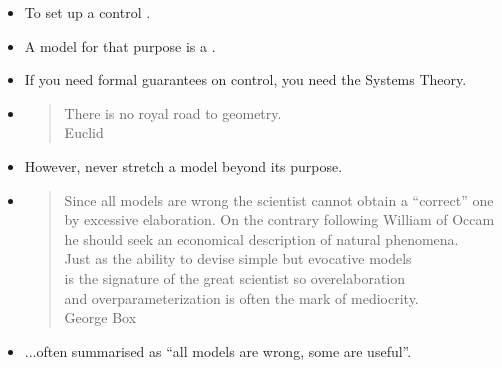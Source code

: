 \begin{frame}
\myPause
 \begin{itemize}[<+-| alert@+>]
 \item To set up a control .
 \item A model for that purpose is a .
 \item If you need formal guarantees on control, you need the Systems Theory.
 \item []{\small
       \begin{quote}
        There is no royal road to geometry.\\
        \vspace{1mm}\hspace{70mm}Euclid
       \end{quote}
       }
 \item However, never stretch a model beyond its purpose.
 \item []{\small
       \begin{quote}
        Since all models are wrong the scientist cannot obtain a ``correct'' one\\
        by excessive elaboration. On the contrary following William of Occam\\
        he should seek an economical description of natural phenomena.\\
        Just as the ability to devise simple but evocative models\\
        is the signature of the great scientist so overelaboration\\
        and overparameterization is often the mark of mediocrity.\\
        \vspace{1mm}\hspace{70mm}George Box
       \end{quote}
       }
 \item []...often summarised as ``all models are wrong, some are useful''. 
 \end{itemize}
\end{frame}
